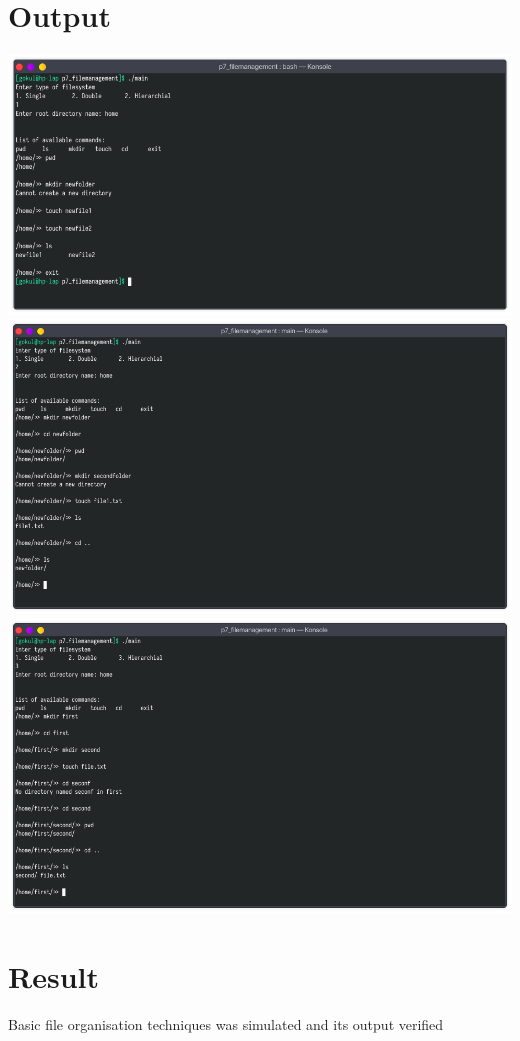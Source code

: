 \documentclass[13pt,oneside]{book}
\begin{document}
    \section*{Output}
    \includegraphics[width=\textwidth]{img/p7/ss1.png}
    \includegraphics[width=\textwidth]{img/p7/ss2.png}
    \includegraphics[width=\textwidth]{img/p7/ss3.png}
\Large
\section*{Result}
\large
Basic file organisation techniques was simulated and its output verified
\end{document}
